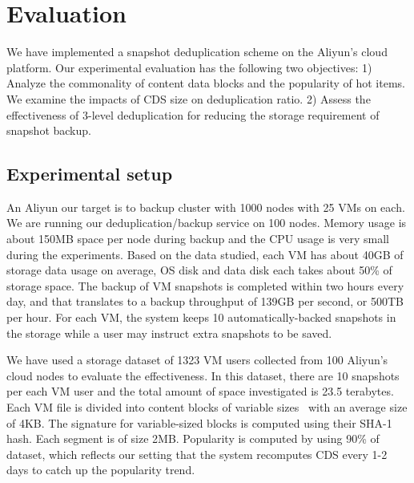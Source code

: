 
\section{Evaluation}
\label{sect:exper}

We have implemented a snapshot deduplication scheme on the Aliyun's cloud platform.
Our experimental evaluation has the following two objectives:
1) Analyze the commonality of content data blocks and the popularity  of hot items. We 
examine the impacts of CDS size on deduplication ratio.
2) Assess the effectiveness  of 3-level deduplication for reducing the storage requirement of snapshot 
backup. 

\subsection{Experimental setup}

An Aliyun our target is to backup cluster with 1000 nodes
with 25 VMs on each.
We are running our deduplication/backup  service on 100 nodes.
Memory usage is about 150MB space per node during backup and
the CPU usage is very small during the experiments. 
Based on the data studied,  each VM has about  40GB of storage  data usage on average,
OS disk and data disk each takes about 50\% of storage space.
The backup of VM snapshots is completed within two hours  every day,
and that translates to a backup throughput of 139GB per second, or 500TB per hour.
For each VM, the system keeps 10 automatically-backed snapshots in the storage while
a user may instruct extra snapshots to be saved.



We have used a storage dataset of  1323 VM users collected from 100 Aliyun's cloud nodes to evaluate the effectiveness.
In this dataset, there are 10 snapshots per each VM user and the total amount of space investigated 
is 23.5 terabytes.
Each VM file is  divided into content blocks of
variable sizes~\cite{similar94,rabin81} with an average size of 4KB. 
The signature for variable-sized blocks is computed using  their SHA-1 hash. 
Each segment is of size 2MB.  
Popularity is computed by using 90\% of dataset, which reflects our setting that the system recomputes
CDS every 1-2 days to catch up the popularity trend.

